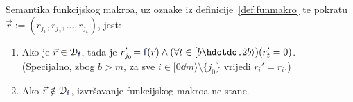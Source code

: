 \begin{propozicija}[{name=[semantika funkcijskog makroa]}]\label{prop:semfmacro}
Semantika funkcijskog makroa, uz oznake iz definicije~\ref{def:funmakro} te pokratu $\vec r:=(r_{j_1},r_{j_2},\dotsc,r_{j_k})$, jest:
\begin{enumerate}
    \item\label{case:in} Ako je $\vec r\in\dom{\f{f}}$, tada je $r_{j_0}'\!=\f{f}(\vec r)\land(\forall t\in[b\dd 2b\rangle)(r_t'=0)$.\\
    (Specijalno, zbog $b>m$, za sve $i\in[0\dd m\rangle\setminus\{j_0\}$ vrijedi $r_i'=r_i$.)
    \item\label{case:notin} Ako $\vec r\notin\dom{\f{f}}$, izvršavanje funkcijskog makroa ne stane.
\end{enumerate}
\end{propozicija}
